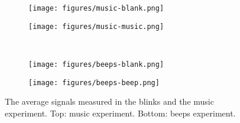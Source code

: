 \begin{figure}[h]
    \centering
    \begin{subfigure}{0.5\linewidth}
        \centering
        \captionsetup{width = 0.9\linewidth}
        \texttt{[image: figures/music-blank.png]}
    \end{subfigure}%
    \begin{subfigure}{0.5\linewidth}
        \centering
        \captionsetup{width = 0.9\linewidth}
        \texttt{[image: figures/music-music.png]}
    \end{subfigure}%
    \\
    \begin{subfigure}{0.5\linewidth}
        \centering
        \captionsetup{width = 0.9\linewidth}
        \texttt{[image: figures/beeps-blank.png]}
    \end{subfigure}%
    \begin{subfigure}{0.5\linewidth}
        \centering
        \captionsetup{width = 0.9\linewidth}
        \texttt{[image: figures/beeps-beep.png]}
    \end{subfigure}%
    \caption{The average signals measured in the blinks and the music experiment. Top: music experiment. Bottom: beeps experiment.}
    \label{fig:sound}
\end{figure}